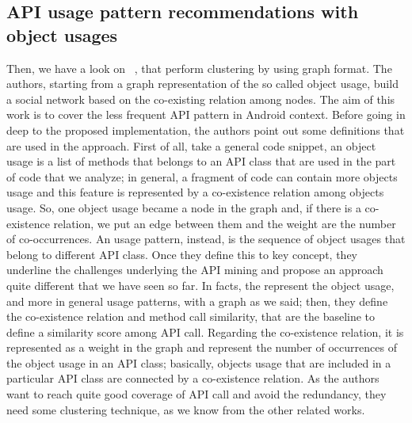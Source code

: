 \subsection{API usage pattern recommendations with object usages}
Then, we have a look on ~\cite{niu_api_2017}, that perform clustering by using graph format. The authors, starting from a graph representation of the so called object usage, build a social network based on the co-existing relation among nodes. The aim of this work is to cover the less frequent API pattern in Android context. Before going in deep to the proposed implementation, the authors point out some definitions that are used in the approach. First of all, take a general code snippet, an object usage is a list of methods that belongs to an API class that are used in the part of code that we analyze; in general, a fragment of code can contain more objects usage and this feature is represented by a co-existence relation among objects usage. So, one object usage became a node in the graph and, if there is a co-existence relation, we put an edge between them and the weight are the number of co-occurrences. An usage pattern, instead, is the sequence of object usages that belong to different API class. Once they define this to key concept, they underline the challenges underlying the API mining and propose an approach quite different that we have seen so far. In facts, the represent the object usage, and more in general usage patterns, with a graph as we said; then, they define the co-existence relation and method call similarity, that are the baseline to define a similarity score among API call. Regarding the co-existence relation, it is represented as a weight in the graph and represent the number of occurrences of the object usage in an API class; basically, objects usage that are included in a particular API class are connected by a co-existence relation. As the authors want to reach quite good coverage of API call and avoid the redundancy, they need some clustering technique, as we know from the other related works. \newline
